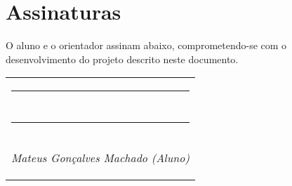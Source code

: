 \newcommand{\namesigdate}[2][10cm]{%
  \begin{tabular}{@{}p{#1}@{}}
    #2 \\[2\normalbaselineskip] \hrule \\[0pt]
    {\small \begin{center}
    \textit{Tsang Ing Ren (Orientador)}}
    \end{center} \\[2\normalbaselineskip] \hrule \\[0pt]
    {\small \begin{center}\textit{Mateus Gonçalves Machado (Aluno)}\end{center}}
  \end{tabular}
}
\chapter{Assinaturas}
O aluno e o orientador assinam abaixo, comprometendo-se com o desenvolvimento
do projeto descrito neste documento.

\begin{center}
\noindent \namesigdate{} \hfill 
\end{center}
